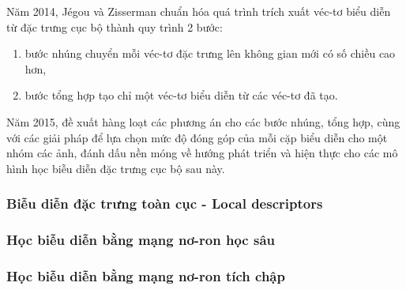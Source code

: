 Năm 2014, Jégou và Zisserman chuẩn hóa quá trình trích xuất véc-tơ biểu diễn từ đặc trưng cục bộ thành quy trình 2 bước\cite{Jegou_2014_CVPR}:

\begin{enumerate}
    \item bước nhúng chuyển mỗi véc-tơ đặc trưng lên không gian mới có số chiều cao hơn,
    \item bước tổng hợp tạo chỉ một véc-tơ biểu diễn từ các véc-tơ đã tạo.
\end{enumerate}

Năm 2015, \cite{selective-match-kernel} đề xuất hàng loạt các phương án cho các bước nhúng, tổng hợp, cùng với các giải pháp để lựa chọn mức độ đóng góp của mỗi cặp biểu diễn cho một nhóm các ảnh, đánh dấu nền móng về hướng phát triển và hiện thực cho các mô hình học biễu diễn đặc trưng cục bộ sau này.

\subsubsection{Biễu diễn đặc trưng toàn cục  - Local descriptors}

\subsubsection{Học biễu diễn bằng mạng nơ-ron học sâu}

\subsubsection{Học biễu diễn bằng mạng nơ-ron tích chập}
